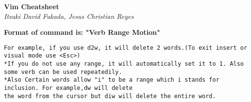 \documentclass{article}
\begin{document}
\begin{center}
\Large\textbf{Vim Cheatsheet}\\
\textit{Itsuki David Fukada, Jesus Christian Reyes}
\end{center}

\begin{framed}
\begin{center}
\textbf{Format of command is: "Verb Range Motion"}
\end{center}
\begin{verbatim}
For example, if you use d2w, it will delete 2 words.(To exit insert or visual mode use <Esc>)
*If you do not use any range, it will automatically set it to 1. Also some verb can be used repeatedily.
*Also Certain words allow "i" to be a range which i stands for inclusion. For example,dw will delete 
the word from the cursor but diw will delete the entire word. 
\end{verbatim}
\end{framed}
\end{document}
